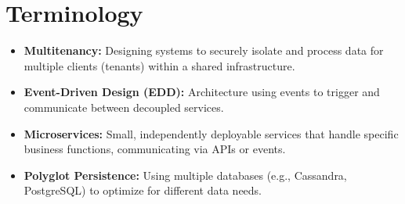 \documentclass[11pt]{article}
\begin{document}
\section{Terminology}
\begin{itemize}
    \item \textbf{Multitenancy:} Designing systems to securely isolate and process data for multiple clients (tenants) within a shared infrastructure.
    \item \textbf{Event-Driven Design (EDD):} Architecture using events to trigger and communicate between decoupled services.
    \item \textbf{Microservices:} Small, independently deployable services that handle specific business functions, communicating via APIs or events.
    \item \textbf{Polyglot Persistence:} Using multiple databases (e.g., Cassandra, PostgreSQL) to optimize for different data needs.
\end{itemize}
\end{document}
